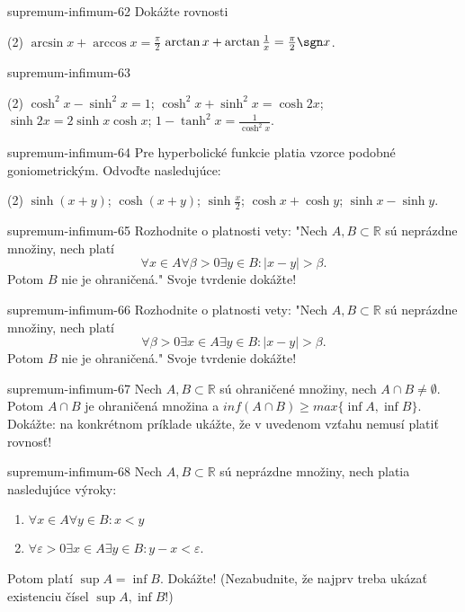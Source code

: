 \begin{defproblem}{supremum-infimum-62}
Dokážte rovnosti
\begin{tasks}(2)
  \task $\arcsin x +\arccos x =\frac{\pi}{2}$
  \task $\arctan x +\arctan\frac{1}{x}=\frac{\pi}{2}\sgn x$.
\end{tasks}
\end{defproblem}

\begin{defproblem}{supremum-infimum-63}
\begin{tasks}(2)
  \task $\cosh^2x - \sinh^2x=1$;
  \task $\cosh^2x + \sinh^2x=\cosh 2x$;
  \task $\sinh 2x = 2\sinh x \cosh x$;
  \task $1 - \tanh^2x = \frac{1}{\cosh^2x}$.
\end{tasks}
\end{defproblem}

\begin{defproblem}{supremum-infimum-64}
Pre hyperbolické funkcie platia vzorce podobné goniometrickým. Odvoďte nasledujúce:
\begin{tasks}(2)
  \task $\sinh(x+y)$;
  \task $\cosh(x+y)$;
  \task $\sinh\frac{x}{2}$;
  \task $\cosh x + \cosh y$;
  \task $\sinh x - \sinh y$.
\end{tasks}
\end{defproblem}

\begin{defproblem}{supremum-infimum-65}
Rozhodnite o platnosti vety: "Nech $A,B\subset\mathbb{R}$ sú neprázdne množiny,
nech platí $$\forall x\in A \forall \beta >0 \exists y\in B: |x-y|>\beta.$$
Potom $B$ nie je ohraničená." Svoje tvrdenie dokážte!
\end{defproblem}

\begin{defproblem}{supremum-infimum-66}
Rozhodnite o platnosti vety: "Nech $A,B\subset\mathbb{R}$ sú neprázdne množiny,
nech platí $$\forall \beta >0 \exists x\in A \exists y\in B: |x-y|>\beta.$$
Potom $B$ nie je ohraničená." Svoje tvrdenie dokážte!
\end{defproblem}

\begin{defproblem}{supremum-infimum-67}
Nech $A,B\subset\mathbb{R}$ sú ohraničené množiny, nech $A\cap B\neq\emptyset$.
Potom $A\cap B$ je ohraničená množina a $inf(A\cap B)\geq max \{\inf A,\inf
B\}$. Dokážte: na konkrétnom príklade ukážte, že v uvedenom vzťahu nemusí platiť
rovnosť!
\end{defproblem}

\begin{defproblem}{supremum-infimum-68}
Nech $A,B\subset\mathbb{R}$ sú neprázdne množiny, nech platia nasledujúce výroky:
\begin{enumerate}
\item $\forall x\in A \forall y\in B: x<y$
\item $\forall \varepsilon>0 \exists x\in A \exists y\in B:y-x<\varepsilon$.
\end{enumerate}
Potom platí $\sup A =\inf B$. Dokážte! (Nezabudnite, že najprv treba ukázať
existenciu čísel $\sup A,\inf B$!)
\end{defproblem}

